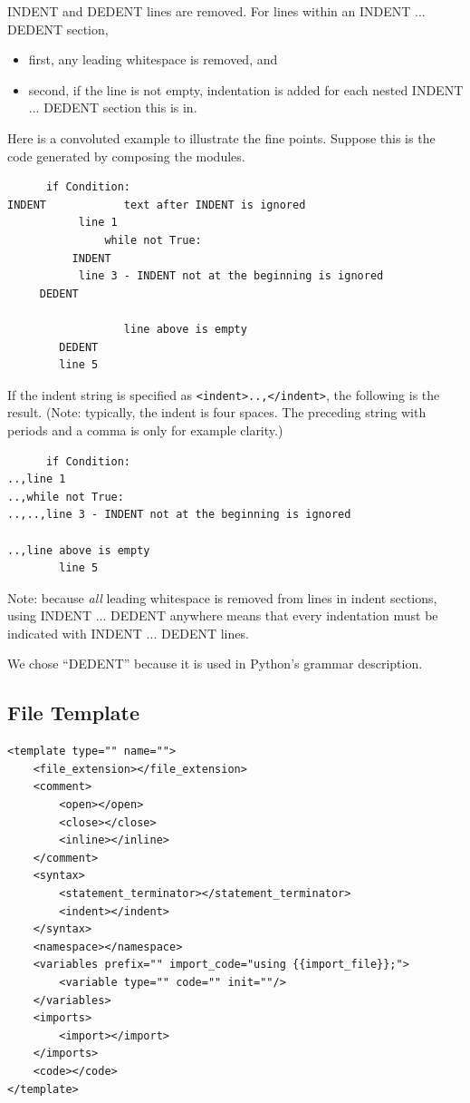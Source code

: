 \documentclass[12pt]{article}
\begin{document}
INDENT and DEDENT lines are removed.
For lines within an INDENT ... DEDENT section,
\begin{itemize}[nosep]
\item first, any leading whitespace is removed, and
\item second, if the line is not empty, indentation is added for each nested
  INDENT ... DEDENT section this is in.
\end{itemize}

Here is a convoluted example to illustrate the fine points.  Suppose this is the
code generated by composing the modules.
\begin{verbatim}
      if Condition:
INDENT            text after INDENT is ignored
           line 1
               while not True:
          INDENT
           line 3 - INDENT not at the beginning is ignored
     DEDENT

                  line above is empty
        DEDENT
        line 5
\end{verbatim}
If the indent string is specified as \verb|<indent>..,</indent>|, the following is
the result. (Note: typically, the indent is four spaces. The preceding string with
periods and a comma is only for example clarity.)
\begin{verbatim}
      if Condition:
..,line 1
..,while not True:
..,..,line 3 - INDENT not at the beginning is ignored

..,line above is empty
        line 5
\end{verbatim}

Note: because \emph{all} leading whitespace is removed from lines in indent sections,
using INDENT ... DEDENT anywhere means that every indentation must be indicated
with INDENT ... DEDENT lines.

We chose ``DEDENT'' because it is used in Python's grammar description.


\subsection{File Template}
\label{sec: file template}

\begin{verbatim}
<template type="" name="">
    <file_extension></file_extension>
    <comment>
        <open></open>
        <close></close>
        <inline></inline>
    </comment>
    <syntax>
        <statement_terminator></statement_terminator>
        <indent></indent>
    </syntax>
    <namespace></namespace>
    <variables prefix="" import_code="using {{import_file}};">
        <variable type="" code="" init=""/>
    </variables>
    <imports>
        <import></import>
    </imports>
    <code></code>
</template>
\end{verbatim}
\end{document}
